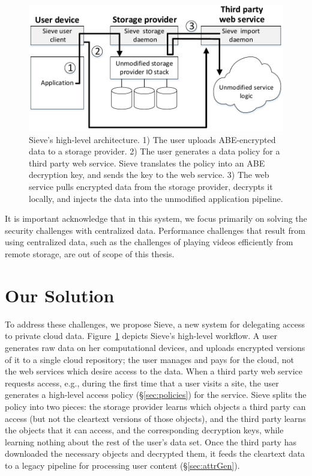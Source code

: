 \begin{figure}
  \centering
     \includegraphics{figs/arch.pdf}
     \caption[Sieve's high-level architecture]
     {Sieve's high-level architecture. 1) The user uploads
              ABE-encrypted data to a storage provider. 2) The user
              generates a data policy for a third party web
              service. Sieve translates the policy into an ABE
              decryption key, and sends the key to the web service.
              3) The web service pulls encrypted data from the
              storage provider, decrypts it locally, and injects
              the data into the unmodified application pipeline.}
  \label{fig:sieve}
\end{figure}

It is important acknowledge that in this system,
we focus primarily on solving the security challenges
with centralized data. Performance challenges that result
from using centralized data, such as the challenges of
playing videos efficiently from 
remote storage, are out of scope of this thesis.

\section{Our Solution}

To address these challenges, we propose Sieve,
a new system for delegating access to
private cloud data. Figure~\ref{fig:sieve} depicts
Sieve's high-level workflow. A user generates
raw data on her computational devices, and
uploads encrypted versions of it to a single cloud
repository; the user manages and pays for the 
cloud, not the web services which
desire access to the data. When a third party web service
requests access, e.g., during the first
time that a user visits a site, the user
generates a high-level access policy (\S\ref{sec:policies})
for the service. Sieve splits the policy into
two pieces: the storage provider learns which
objects a third party can access (but not the
cleartext versions of those objects), and the
third party learns the objects that it can
access, and the corresponding decryption keys,
while learning nothing about the rest of the
user's data set. Once the third party has
downloaded the necessary objects and decrypted
them, it feeds the cleartext data to a legacy
pipeline for processing user content (\S\ref{sec:attrGen}).

